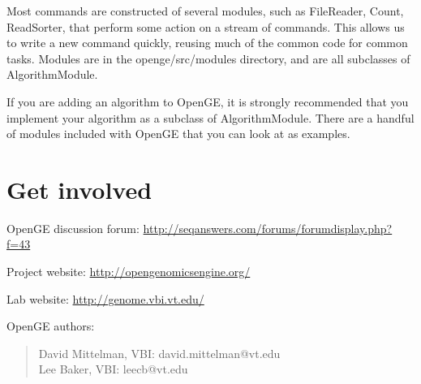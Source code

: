 \documentclass[11pt]{article}
\newcommand {\cmd}[1] {\begin{quote}#1\end{quote}}
\begin{document}
Most commands are constructed of several modules, such as FileReader, Count, ReadSorter, that perform some action on a stream of commands. This allows us to write a new command quickly, reusing much of the common code for common tasks. Modules are in the openge/src/modules directory, and are all subclasses of AlgorithmModule.

If you are adding an algorithm to OpenGE, it is strongly recommended that you implement your algorithm as a subclass of AlgorithmModule. There are a handful of modules included with OpenGE that you can look at as examples.

\section {Get involved}

OpenGE discussion forum: \url{http://seqanswers.com/forums/forumdisplay.php?f=43}

Project website: \url{http://opengenomicsengine.org/}

Lab website: \url{http://genome.vbi.vt.edu/}

OpenGE authors:
\cmd{David Mittelman, VBI: david.mittelman@vt.edu\\Lee Baker, VBI: leecb@vt.edu}
\end{document}

